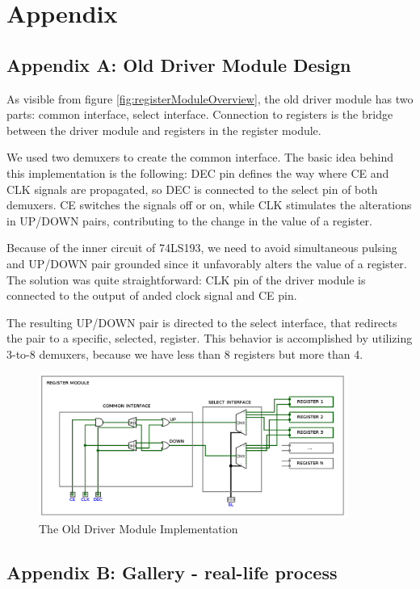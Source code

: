 \section{Appendix} \label{sec:appendix}
\subsection{Appendix A: Old Driver Module Design} \label{sec:appendix:old_driver_module_design}

As visible from figure \ref{fig:registerModuleOverview}, the old driver module has two parts: common interface, select interface. Connection to registers is the bridge between the driver module and registers in the register module.

We used two demuxers to create the common interface. The basic idea behind this implementation is the following: DEC pin defines the way where CE and CLK signals are propagated, so DEC is connected to the select pin of both demuxers. CE switches the signals off or on, while CLK stimulates the alterations in UP/DOWN pairs, contributing to the change in the value of a register. 

Because of the inner circuit of 74LS193, we need to avoid simultaneous pulsing and UP/DOWN pair grounded since it unfavorably alters the value of a register. The solution was quite straightforward: CLK pin of the driver module is connected to the output of anded clock signal and CE pin. 

The resulting UP/DOWN pair is directed to the select interface, that redirects the pair to a specific, selected, register. This behavior is accomplished by utilizing 3-to-8 demuxers, because we have less than 8 registers but more than 4.

\begin{figure}[H]
	\centering
	\includegraphics[width=0.9\textwidth]{img/driver_module_implementation}
	\caption{The Old Driver Module Implementation}
	\label{fig:driverModuleImplementation}
\end{figure}

\subsection{Appendix B: Gallery - real-life process} \label{sec:appendix:gallery}